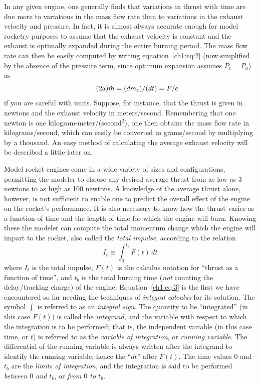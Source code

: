 In any given engine, one generally finds that variations in thrust with time are due more to
variations in the mass flow rate than to variations in the exhaust velocity and pressure. In
fact, it is almost always accurate enough for model rocketry purposes to assume that the exhaust
velocity is constant and the exhaust is optimally expanded during the entire burning period. The
mass flow rate can then be easily computed by writing equation~\eqref{ch1:eq:2} (now simplified
by the absence of the pressure term, since optimum expansion assumes $P_e = P_a$)
as
\begin{equation*}\tag{2a}\label{ch1:eq:n2a}
\dot{m} = (dm_e)/(dt) = F/c
\end{equation*}
if you are careful with units. Suppose, for instance, that the thrust
is given in newtons and the exhaust velocity in meters/second. Remembering that one newton is one
kilogram-meter/(second$^{2}$), one then obtains the mass flow rate in kilograms/second, which can
easily be converted to grams/second by multiplying by a thousand. An easy method of calculating
the average exhaust velocity will be described a little later on.

Model rocket engines come in a wide variety of sizes and configurations, permitting the modeler
to choose any desired average thrust from as low as 3 newtons to as high as 100 newtons. A
knowledge of the average thrust alone, however, is not sufficient to enable one to predict the
overall effect of the engine on the rocket's performance. It is also necessary to know how the
thrust varies as a function of time and the length of time for which the engine will burn.
Knowing these the modeler can compute the total momentum change which the engine will impart to
the rocket, also called the \emph{total impulse}, according to the relation
\begin{equation}\label{ch1:eq:3}
I_t \equiv \int_{0}^{t_b} F(t)\,dt
\end{equation}
where $I_t$ is the total impulse, $F(t)$ is the calculus notation for ``thrust as a function of
time'', and $t_b$ is the total burning time (\emph{not} counting the delay/tracking charge) of the
engine. Equation~\eqref{ch1:eq:3} is the first we have encountered so far needing the techniques
of \emph{integral calculus} for its solution. The symbol $\int$ is referred to as an
\emph{integral sign}. The quantity to be ``integrated'' (in this case $F(t)$) is called the
\emph{integrand}, and the variable with respect to which the integration is to be performed; that
is, the independent variable (in this case time, or $t$) is referred to as the \emph{variable of
integration}, or \emph{running variable}. The differential of the running variable is always
written after the integrand to identify the running variable; hence the ``$dt$'' after $F(t)$.
The time values $0$ and $t_b$ are the \emph{limits of integration}, and the integration is said
to be performed \emph{between $0$ and $t_b$}, or \emph{from $0$ to $t_b$}.

